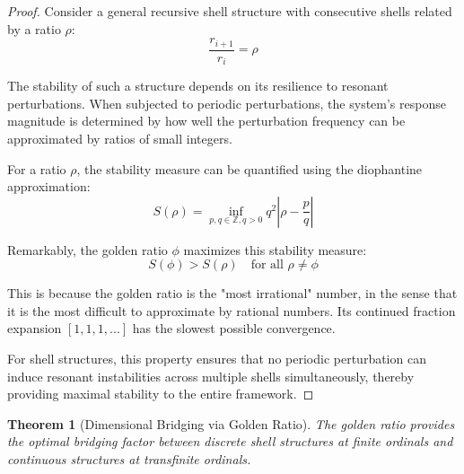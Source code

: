 \documentclass[12pt,a4paper]{article}
\newtheorem{theorem}{Theorem}[section]
\begin{document}
    \begin{proof}
    Consider a general recursive shell structure with consecutive shells related by a ratio $\rho$:
    \begin{equation}
    \frac{r_{i+1}}{r_i} = \rho
    \end{equation}
    
    The stability of such a structure depends on its resilience to resonant perturbations. When subjected to periodic perturbations, the system's response magnitude is determined by how well the perturbation frequency can be approximated by ratios of small integers.
    
    For a ratio $\rho$, the stability measure can be quantified using the diophantine approximation:
    \begin{equation}
    S(\rho) = \inf_{p,q \in \mathbb{Z}, q > 0} q^2 \left|\rho - \frac{p}{q}\right|
    \end{equation}
    
    Remarkably, the golden ratio $\phi$ maximizes this stability measure:
    \begin{equation}
    S(\phi) > S(\rho) \quad \text{for all } \rho \neq \phi
    \end{equation}
    
    This is because the golden ratio is the "most irrational" number, in the sense that it is the most difficult to approximate by rational numbers. Its continued fraction expansion $[1,1,1,...]$ has the slowest possible convergence.
    
    For shell structures, this property ensures that no periodic perturbation can induce resonant instabilities across multiple shells simultaneously, thereby providing maximal stability to the entire framework.
    \end{proof}
    
    \begin{theorem}[Dimensional Bridging via Golden Ratio]
    \label{thm:dimensional-bridging}
    The golden ratio provides the optimal bridging factor between discrete shell structures at finite ordinals and continuous structures at transfinite ordinals.
    \end{theorem}
    
\end{document}
